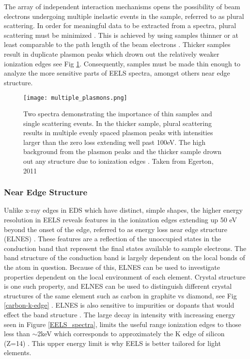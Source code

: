 The array of independent interaction mechanisms opens the possibility of beam electrons undergoing multiple inelastic events in the sample, referred to as plural scattering.  In order for meaningful data to be extracted from a spectra, plural scattering must be minimized \cite{Egerton}. This is achieved by using samples thinner or at least comparable to the path length of the beam electrons \cite{Egerton}.  Thicker samples result in duplicate plasmon peaks which  drown out the relatively weaker ionization edges see Fig \ref{multiple_plasmons}.   Consequently, samples must be made thin enough to analyze the more sensitive parts of EELS spectra, amongst others near edge structure. \\

\begin{figure}
	\centering
	\texttt{[image: multiple\_plasmons.png]}
	\caption{Two spectra demonstrating the importance of thin samples and single scattering events. In the thicker sample, plural scattering results in multiple evenly spaced plasmon peaks with  intensities larger than the zero loss extending well past 100eV.  The high background from the plasmon peaks and the thicker sample drown out any structure due to ionization edges \cite{Egerton}. Taken from Egerton, 2011 \cite{Egerton}}
	\label{multiple_plasmons}
\end{figure}





\subsubsection{Near Edge Structure}
Unlike x-ray edges in EDS which have distinct, simple shapes, the higher energy resolution in EELS reveals features in the ionization edges extending up 50 eV beyond the onset of the edge, referred to as energy loss near edge structure (ELNES) \cite{Egerton}.   These features are a reflection of the unoccupied states in the conduction band that represent the final states available to sample electrons.  The band structure of the conduction band is largely dependent on the local bonds of the atom in question.  Because of this, ELNES can be used to investigate properties dependent on the local environment of each element.   Crystal structure is one such property, and ELNES can be used to distinguish different crystal structures of the same element such as carbon in graphite vs diamond, see Fig \ref{carbon-k-edge} \cite{hamon_elnes_2004}.  ELNES is also sensitive to impurities or dopants that would effect the band structure \cite{torrisi_atomic_2016}.  The large decay in intensity with increasing energy seen in Figure \ref{EELS_spectra}, limits the useful range ionization edges to those less than $\sim$2keV which corresponds to approximately the K edge of silicon (Z=14) \cite{reimer_transmission_2008}. This upper energy limit is why EELS is better tailored for light elements.   \\

